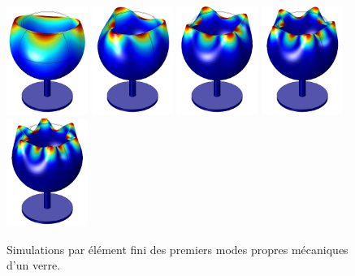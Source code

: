 \documentclass[12pt,a4paper]{article}
\begin{document}
\begin{figure}[b]
\center
\includegraphics[height=100pt]{figures/wine_glass_f0.png}
\hfill
\includegraphics[height=100pt]{figures/wine_glass_f1.png}
\hfill
\includegraphics[height=100pt]{figures/wine_glass_f2.png}
\hfill
\includegraphics[height=100pt]{figures/wine_glass_f3.png}
\hfill
\includegraphics[height=100pt]{figures/wine_glass_f4.png}
\caption{Simulations par élément fini des premiers modes propres mécaniques d'un verre.}
\label{fig:wine_glass}
\end{figure}
\end{document}
